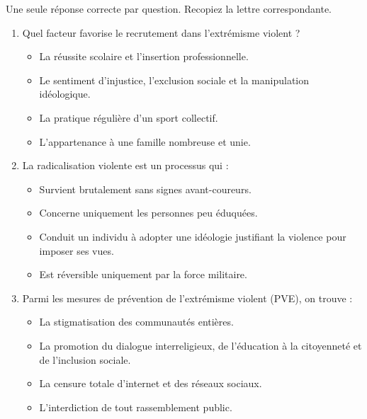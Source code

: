 \documentclass[11pt]{article}
\begin{document}
\begin{exercice}
Une seule réponse correcte par question. Recopiez la lettre correspondante.
\begin{enumerate}
    \item Quel facteur favorise le recrutement dans l'extrémisme violent ?
    \begin{itemize}
        \item[A] La réussite scolaire et l'insertion professionnelle.
        \item[B] Le sentiment d'injustice, l'exclusion sociale et la manipulation idéologique.
        \item[C] La pratique régulière d'un sport collectif.
        \item[D] L'appartenance à une famille nombreuse et unie.
    \end{itemize}
    \item La radicalisation violente est un processus qui :
    \begin{itemize}
        \item[A] Survient brutalement sans signes avant-coureurs.
        \item[B] Concerne uniquement les personnes peu éduquées.
        \item[C] Conduit un individu à adopter une idéologie justifiant la violence pour imposer ses vues.
        \item[D] Est réversible uniquement par la force militaire.
    \end{itemize}
    \item Parmi les mesures de prévention de l'extrémisme violent (PVE), on trouve :
    \begin{itemize}
        \item[A] La stigmatisation des communautés entières.
        \item[B] La promotion du dialogue interreligieux, de l'éducation à la citoyenneté et de l'inclusion sociale.
        \item[C] La censure totale d'internet et des réseaux sociaux.
        \item[D] L'interdiction de tout rassemblement public.
    \end{itemize}
\end{enumerate}
\end{exercice}
\end{document}
